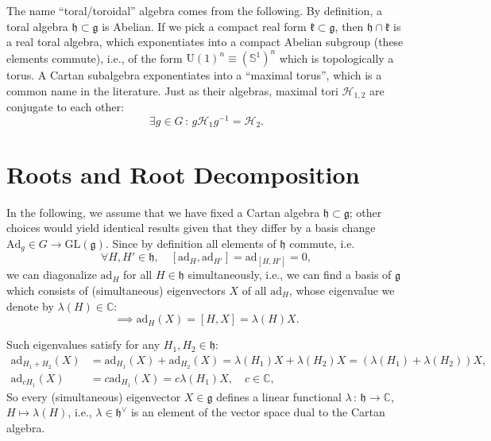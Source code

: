 The name “toral/toroidal” algebra comes from the following. By definition, a toral algebra \(\mathfrak{h} \subset \mathfrak{g}\) is Abelian. If we pick a compact real form \(\mathfrak{k} \subset \mathfrak{g}\), then \(\mathfrak{h} \cap \mathfrak{k}\) is a real toral algebra, which exponentiates into a compact Abelian subgroup (these elements commute), i.e., of the form \(\mathrm{U}(1)^n \equiv (\mathbb{S}^1)^n \) which is topologically a torus. A Cartan subalgebra exponentiates into a “maximal torus”, which is a common name in the literature. Just as their algebras, maximal tori \(\mathcal{H}_{1,2}\) are conjugate to each other:
\[
    \exists g \in G \,:\, g\mathcal{H}_1g^{-1} = \mathcal{H}_2.
\]

\section{Roots and Root Decomposition}

In the following, we assume that we have fixed a Cartan algebra \(\mathfrak{h} \subset \mathfrak{g}\); other choices would yield identical results given that they differ by a basis change \(\mathrm{Ad}_g \in G \to \mathrm{GL}(\mathfrak{g})\). Since by definition all elements of \(\mathfrak{h}\) commute, i.e.
\[
    \forall H, H' \in \mathfrak{h}, \quad [\mathrm{ad}_H, \mathrm{ad}_{H'}] = \mathrm{ad}_{[H, H']} = 0,
\]
we can diagonalize \(\mathrm{ad}_H\) for all \(H \in \mathfrak{h}\) simultaneously, i.e., we can find a basis of \(\mathfrak{g}\) which consists of (simultaneous) eigenvectors \(X\) of all \(\mathrm{ad}_H\), whose eigenvalue we denote by \(\lambda(H) \in \mathbb{C}\):
\[
    \implies \mathrm{ad}_H(X) = [H, X] = \lambda(H) X.
\]

Such eigenvalues satisfy for any \(H_1, H_2 \in \mathfrak{h}\):
\[
    \begin{aligned}
        \mathrm{ad}_{H_1 + H_2}(X) & = \mathrm{ad}_{H_1}(X) + \mathrm{ad}_{H_2}(X) = \lambda(H_1) X + \lambda(H_2) X = (\lambda(H_1) + \lambda(H_2)) X, \\
        \mathrm{ad}_{c H_1}(X)     & = c \mathrm{ad}_{H_1}(X) = c \lambda(H_1) X, \quad c \in \mathbb{C},
    \end{aligned}
\]
So every (simultaneous) eigenvector \(X \in \mathfrak{g}\) defines a linear functional \(\lambda \,:\, \mathfrak{h} \to \mathbb{C}\), \(H \mapsto \lambda(H)\), i.e., \(\lambda \in \mathfrak{h}^\vee\) is an element of the vector space dual to the Cartan algebra.

